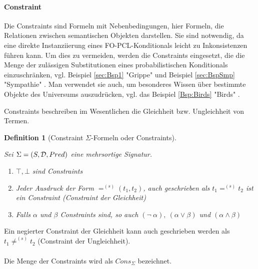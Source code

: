 \documentclass[a4paper, 11pt]{book}
\newtheorem{Def}{Definition }[section]
\begin{document}
\paragraph{Constraint}  \label{constraint}

Die Constraints  sind Formeln mit Nebenbedingungen, hier Formeln, die Relationen zwischen semantischen Objekten darstellen. Sie sind notwendig, da eine direkte Instanziierung eines FO-PCL-Konditionals  leicht zu Inkonsistenzen führen kann. Um dies zu vermeiden, werden die Constraints eingesetzt, die die Menge der zulässigen Substitutionen eines probabilistischen Konditionals  einzuschränken, vgl. Beispiel \ref{sec:Bsp1} "{}Grippe"{}  und Beispiel \ref{sec:BspSmp} "{}Sympathie"{} . Man verwendet sie auch, um besonderes Wissen über bestimmte Objekte des Universums auszudrücken, vgl. das Beispiel \ref{Bsp:Birds} "{}Birds"{} .

Constraints beschreiben im Wesentlichen die Gleichheit bzw. Ungleichheit von Termen.

\begin{Def}[Constraint $ \Sigma $-Formeln oder Constraints]\cite[Kap. 6.2, S. 126/127 vgl. Def. 6.2.4]{Fis10} \label{Def:Constraint}
	
\noindent
Sei $ \Sigma = (S, {\cal D}, Pred) $ eine mehrsortige Signatur.
\begin{enumerate}
\renewcommand{\labelenumi}{\textnormal{(\theenumi)}}
\item {$ \top, \bot $ sind  Constraints}
\item {Jeder Ausdruck der Form $ =^{(s)} (t_1, t_2)$, auch geschrieben als $ t_1 =^{(s)} t_2 $} ist ein Constraint (Constraint der Gleichheit)
\item{Falls $ \alpha $ und $ \beta $ Constraints sind, so auch $  (\neg ~ \alpha),~  (\alpha \vee \beta)$ und $ (\alpha \wedge \beta)  $} 
\end{enumerate}
\end{Def}
Ein negierter Constraint der Gleichheit kann auch geschrieben werden als $ t_1 \not=^{(s)} t_2 $ (Constraint der Ungleichheit). \\
\\Die Menge der Constraints wird als $ Cons_{\Sigma} $  bezeichnet.\\
\end{document}
